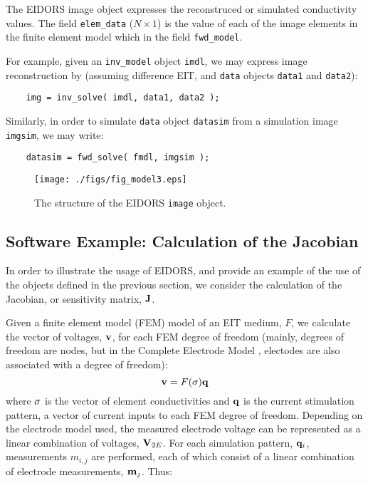 \documentclass[12pt]{iopart}
\begin{document}
The EIDORS image object expresses the reconstruced or
simulated conductivity values. The field {\tt elem\_data}
($N\times1$) is the value of each of the image elements in 
the finite element model which in the field {\tt fwd\_model}.

For example, given
an {\tt inv\_model} object {\tt imdl}, we may express
image reconstruction by (assuming
difference EIT, and {\tt data} objects {\tt data1} and {\tt data2}):
\begin{verbatim}
    img = inv_solve( imdl, data1, data2 );
\end{verbatim}
Similarly, in order to simulate {\tt data} object {\tt datasim}
from a simulation image {\tt imgsim}, we may write:
\begin{verbatim}
    datasim = fwd_solve( fmdl, imgsim );
\end{verbatim}
%
%
\begin{figure}[th]
\begin{flushright}
\texttt{[image: ./figs/fig\_model3.eps]}
\caption{\small The structure of the EIDORS {\tt image} object.
\label{fig:image}
 }
\end{flushright}
\end{figure}


\subsection{Software Example: Calculation of the Jacobian}

In order to illustrate the usage of EIDORS, and provide
an example of the use of the objects defined in the previous
section, we consider
the calculation of the Jacobian, or sensitivity matrix,
$\bf J$.

Given a finite element model (FEM) model of an EIT medium,
$F$, we calculate the vector of voltages, $\bf v$, 
for each FEM degree of freedom
 (mainly, degrees of freedom are nodes, but in the
 Complete Electrode Model \cite{Cheng_etal_1989},
 electodes are also associated
 with a degree of freedom):
\begin{equation}
{\bf v} = F({\bf \sigma}){\bf q} 
\end{equation}
where $\bf \sigma$ is the vector of element conductivities
and $\bf q$ is the current stimulation pattern, a vector
of current inputs to each FEM degree of freedom.
Depending on the electrode model used, the measured electrode
voltage can be represented as a linear combination of 
voltages, ${\bf V}_{2E}$.
For each simulation pattern, ${\bf q}_{i}$,
measurements $m_{i,j}$
are performed, each of which consist of a linear combination of
electrode measurements, ${\bf m}_j$.
Thus:
\end{document}

